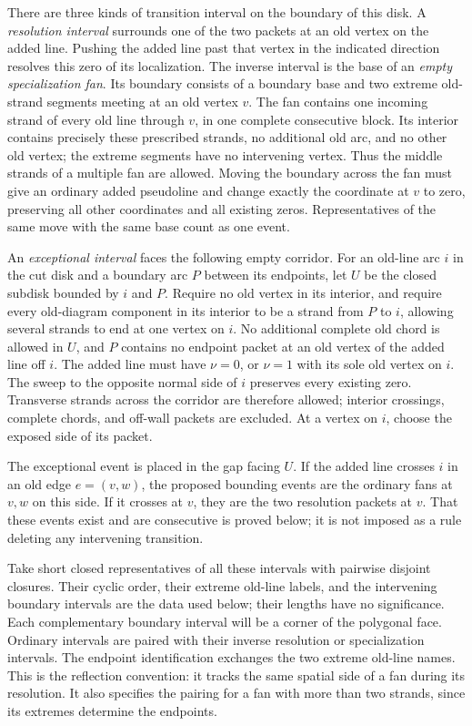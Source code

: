 \documentclass[11pt]{article}
\theoremstyle{definition}\newtheorem{definition}[theorem]{Definition}
\begin{document}
There are three kinds of transition interval on the boundary of this
disk. A \emph{resolution interval} surrounds one of the two packets
at an old vertex on the added line. Pushing the added line past that
vertex in the indicated direction resolves this zero of its
localization. The inverse interval is the base of an \emph{empty
specialization fan}. Its boundary consists of a boundary base and two
extreme old-strand segments meeting at an old vertex $v$. The fan
contains one incoming strand of every old line through $v$, in one
complete consecutive block. Its interior contains precisely these
prescribed strands, no additional old arc, and no other old vertex;
the extreme segments have no intervening vertex. Thus the middle
strands of a multiple fan are allowed. Moving the boundary across the
fan must give an ordinary added pseudoline and change exactly the
coordinate at $v$ to zero, preserving all other coordinates and all
existing zeros. Representatives of the same move with the same base
count as one event.

An \emph{exceptional interval} faces the following empty corridor.
For an old-line arc $i$ in the cut disk and a boundary arc $P$ between
its endpoints, let $U$ be the closed subdisk bounded by $i$ and $P$.
Require no old vertex in its interior, and require every old-diagram
component in its interior to be a strand from $P$ to $i$, allowing
several strands to end at one vertex on $i$. No additional complete
old chord is allowed in $U$, and $P$ contains no endpoint packet at
an old vertex of the added line off $i$. The added line must have
$\nu=0$, or $\nu=1$ with its sole old vertex on $i$. The sweep to the
opposite normal side of $i$ preserves every existing zero. Transverse
strands across the corridor are therefore allowed; interior crossings,
complete chords, and off-wall packets are excluded. At a vertex on
$i$, choose the exposed side of its packet.

The exceptional event is placed in the gap facing $U$. If the added
line crosses $i$ in an old edge $e=(v,w)$, the proposed bounding
events are the ordinary fans at $v,w$ on this side. If it crosses at
$v$, they are the two resolution packets at $v$. That these events
exist and are consecutive is proved below; it is not imposed as a
rule deleting any intervening transition.

Take short closed representatives of all these intervals with pairwise
disjoint closures. Their cyclic order, their extreme old-line labels,
and the intervening boundary intervals are the data used below;
their lengths have no significance. Each complementary boundary
interval will be a corner of the polygonal face. Ordinary intervals
are paired with their inverse resolution or specialization intervals.
The endpoint identification exchanges the two extreme old-line names.
This is the reflection convention: it tracks the same spatial side
of a fan during its resolution. It also specifies the pairing for a
fan with more than two strands, since its extremes determine the
endpoints.
\end{document}

